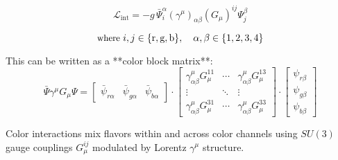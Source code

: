 \documentclass{article}
\begin{document}
    \[
        \mathcal{L}_{\text{int}} = -g\, \bar{\Psi}_i^\alpha (\gamma^\mu)_{\alpha\beta} (G_\mu)^{ij} \Psi_j^\beta
    \]

    \[
        \text{\small where } i,j \in \{\text{r},\text{g},\text{b}\}, \quad \alpha,\beta \in \{1,2,3,4\}
    \]

    \bigskip

    \noindent
    This can be written as a **color block matrix**:
    \[
        \bar{\Psi} \gamma^\mu G_\mu \Psi =
        \begin{bmatrix}
            \bar{\psi}_{r\alpha} & \bar{\psi}_{g\alpha} & \bar{\psi}_{b\alpha}
        \end{bmatrix}
        \cdot
        \begin{bmatrix}
            \gamma^\mu_{\alpha\beta} G_\mu^{11} & \cdots & \gamma^\mu_{\alpha\beta} G_\mu^{13} \\
            \vdots & \ddots & \vdots \\
            \gamma^\mu_{\alpha\beta} G_\mu^{31} & \cdots & \gamma^\mu_{\alpha\beta} G_\mu^{33}
        \end{bmatrix}
        \cdot
        \begin{bmatrix}
            \psi_{r\beta} \\ \psi_{g\beta} \\ \psi_{b\beta}
        \end{bmatrix}
    \]

    \bigskip

    \noindent
    Color interactions mix flavors within and across color channels using $SU(3)$ gauge couplings $G_\mu^{ij}$ modulated by Lorentz $\gamma^\mu$ structure.
\end{document}
